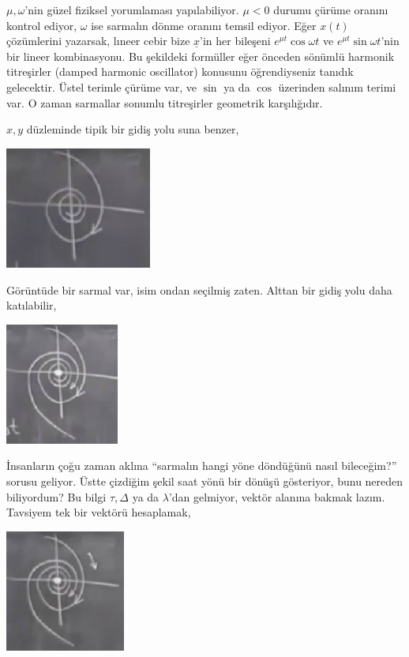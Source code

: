\documentclass[12pt,fleqn]{article}\usepackage{../../common}
\begin{document}
$\mu,\omega$'nin güzel fiziksel yorumlaması yapılabiliyor. $\mu < 0$ durumu
çürüme oranını kontrol ediyor, $\omega$ ise sarmalın dönme oranını temsil
ediyor. Eğer $x(t)$ çözümlerini yazarsak, lıneer cebir bize $\underline{x}$'in
her bileşeni $e^{\mu t} \cos \omega t$ ve $e^{\mu t} \sin \omega t$'nin bir
lineer kombinasyonu. Bu şekildeki formüller eğer önceden sönümlü harmonik
titreşirler (damped harmonic oscillator) konusunu öğrendiyseniz tanıdık
gelecektir. Üstel terimle çürüme var, ve $\sin$ ya da $\cos$ üzerinden salınım
terimi var. O zaman sarmallar sonumlu titreşirler geometrik karşılığıdır.

$x,y$ düzleminde tipik bir gidiş yolu suna benzer,

\includegraphics[height=4cm]{05_13.png}

Görüntüde bir sarmal var, isim ondan seçilmiş zaten. Alttan bir gidiş yolu daha
katılabilir,

\includegraphics[height=4cm]{05_14.png}

İnsanların çoğu zaman aklına ``sarmalın hangi yöne döndüğünü nasıl bileceğim?''
sorusu geliyor. Üstte çizdiğim şekil saat yönü bir dönüşü gösteriyor, bunu
nereden biliyordum? Bu bilgi $\tau,\Delta$ ya da $\lambda$'dan gelmiyor, vektör
alanına bakmak lazım. Tavsiyem tek bir vektörü hesaplamak,

\includegraphics[height=4cm]{05_15.png}
\end{document}
